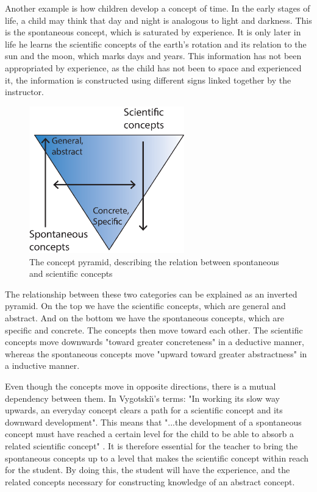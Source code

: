 Another example is how children develop a concept of time. In the early stages of life, a child may think that day and night is analogous to light and darkness. This is the spontaneous concept, which is saturated by experience. It is only later in life he learns the scientific concepts of the earth's rotation and its relation to the sun and the moon, which marks days and years. This information has not been appropriated by experience, as the child has not been to space and experienced it, the information is constructed using different signs linked together by the instructor. 

\begin{figure}
\centering
\includegraphics[width=0.6\textwidth]{img/theoretical/conceptpyramid.eps}
\caption{The concept pyramid, describing the relation between spontaneous and scientific concepts}
\label{fig:conceptpyramid}
\end{figure}

The relationship between these two categories can be explained as an inverted pyramid. On the top we have the scientific concepts, which are general and abstract. And on the bottom we have the spontaneous concepts, which are specific and concrete. The concepts then move toward each other. The scientific concepts move downwards "toward greater concreteness" in a deductive manner, whereas the spontaneous concepts move "upward toward greater abstractness" \citep{vygotsky2012thought} in a inductive manner.

Even though the concepts move in opposite directions, there is a mutual dependency between them. In Vygotski{\u\i}'s terms: "In working its slow way upwards, an everyday concept clears a path for a scientific concept and its downward development". This means that "...the development of a spontaneous concept must have reached a certain level for the child to be able to absorb a related scientific concept" \citep[p. 194]{vygotsky2012thought}. It is therefore essential for the teacher to bring the spontaneous concepts up to a level that makes the scientific concept within reach for the student. By doing this, the student will have the experience, and the related concepts necessary for constructing knowledge of an abstract concept. 

